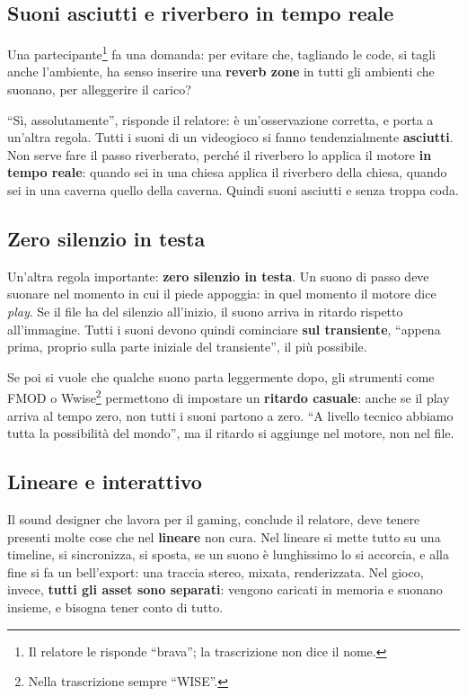 \subsection{Suoni asciutti e riverbero in tempo reale}

Una partecipante\footnote{Il relatore le risponde ``brava''; la trascrizione non
dice il nome.} fa una domanda: per evitare che, tagliando le code, si tagli anche
l'ambiente, ha senso inserire una \textbf{reverb zone} in tutti gli ambienti che
suonano, per alleggerire il carico?

``Sì, assolutamente'', risponde il relatore: è un'osservazione corretta, e porta a
un'altra regola. Tutti i suoni di un videogioco si fanno tendenzialmente
\textbf{asciutti}. Non serve fare il passo riverberato, perché il riverbero lo
applica il motore \textbf{in tempo reale}: quando sei in una chiesa applica il
riverbero della chiesa, quando sei in una caverna quello della caverna. Quindi
suoni asciutti e senza troppa coda.

\subsection{Zero silenzio in testa}

Un'altra regola importante: \textbf{zero silenzio in testa}. Un suono di passo
deve suonare nel momento in cui il piede appoggia: in quel momento il motore dice
\emph{play}. Se il file ha del silenzio all'inizio, il suono arriva in ritardo
rispetto all'immagine. Tutti i suoni devono quindi cominciare \textbf{sul
transiente}, ``appena prima, proprio sulla parte iniziale del transiente'', il
più possibile.

Se poi si vuole che qualche suono parta leggermente dopo, gli strumenti come
FMOD o Wwise\footnote{Nella trascrizione sempre ``WISE''.} permettono di
impostare un \textbf{ritardo casuale}: anche se il play arriva al tempo zero, non
tutti i suoni partono a zero. ``A livello tecnico abbiamo tutta la possibilità
del mondo'', ma il ritardo si aggiunge nel motore, non nel file.

\subsection{Lineare e interattivo}

Il sound designer che lavora per il gaming, conclude il relatore, deve tenere
presenti molte cose che nel \textbf{lineare} non cura. Nel lineare si mette tutto
su una timeline, si sincronizza, si sposta, se un suono è lunghissimo lo si
accorcia, e alla fine si fa un bell'export: una traccia stereo, mixata,
renderizzata. Nel gioco, invece, \textbf{tutti gli asset sono separati}: vengono
caricati in memoria e suonano insieme, e bisogna tener conto di tutto.

